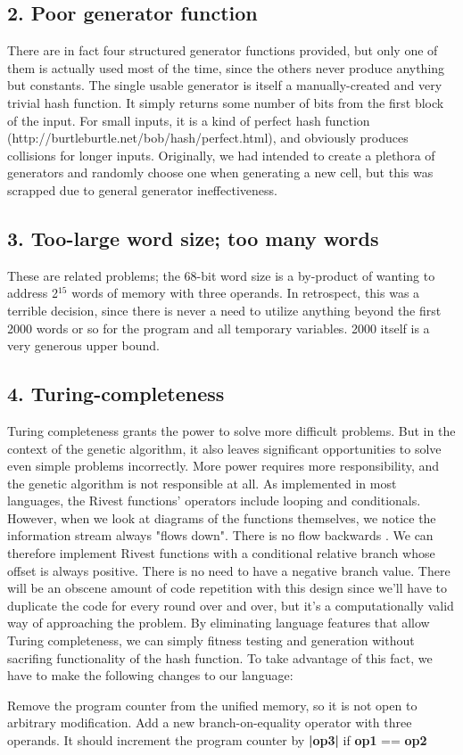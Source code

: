 \documentclass{article}
\begin{document}
\subsection{2. Poor generator function}
There are in fact four structured generator functions provided, but only one of them is actually used most of the time, since the others never produce anything but constants. The single usable generator is itself a manually-created and very trivial hash function. It simply returns some number of bits from the first block of the input. For small inputs, it is a kind of perfect hash function (http://burtleburtle.net/bob/hash/perfect.html), and obviously produces collisions for longer inputs. Originally, we had intended to create a plethora of generators and randomly choose one when generating a new cell, but this was scrapped due to general generator ineffectiveness.

\subsection{3. Too-large word size; too many words}
These are related problems; the 68-bit word size is a by-product of wanting to address 2$^15$ words of memory with three operands. In retrospect, this was a terrible decision, since there is never a need to utilize anything beyond the first 2000 words or so for the program and all temporary variables. 2000 itself is a very generous upper bound.

\subsection{4. Turing-completeness}
Turing completeness grants the power to solve more difficult problems. But in the context of the genetic algorithm, it also leaves significant opportunities to solve even simple problems incorrectly. More power requires more responsibility, and the genetic algorithm is not responsible at all. As implemented in most languages, the Rivest functions' operators include looping and conditionals. However, when we look at diagrams of the functions themselves, we notice the information stream always "flows down". There is no flow backwards \cite{MD5Diagram}. We can therefore implement Rivest functions with a conditional relative branch whose offset is always positive. There is no need to have a negative branch value. There will be an obscene amount of code repetition with this design since we'll have to duplicate the code for every round over and over, but it's a computationally valid way of approaching the problem. By eliminating language features that allow Turing completeness, we can simply fitness testing and generation without sacrifing functionality of the hash function. To take advantage of this fact, we have to make the following changes to our language:
\begin{enumerate}
\list Remove the program counter from the unified memory, so it is not open to arbitrary modification.
\list Add a new branch-on-equality operator with three operands.
\list It should increment the program counter by \textbf{|op3|} if \textbf{op1} == \textbf{op2}
\end{enumerate}
\end{document}
